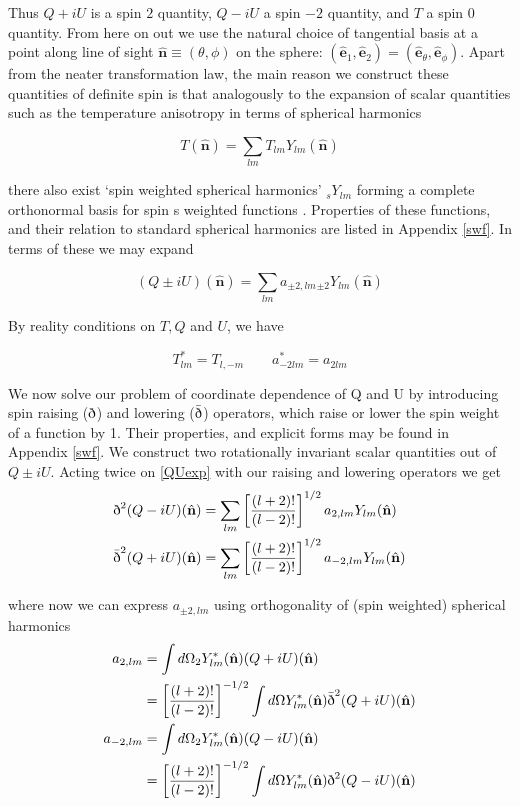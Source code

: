 \documentclass[a4paper,10pt]{article}
\renewcommand{\v}[1]{\mathbf{#1}}
\newcommand{\unit}[1]{\hat{\v{#1}}}
\newcommand{\sr}{\text{\normalfont\dh}}
\renewcommand{\sl}{\bar{\text{\normalfont\dh}}}
\newcommand{\ltwo}{\left[\frac{(l+2)!}{(l-2)!}\right]}
\begin{document}
Thus $Q+iU$ is a spin $2$ quantity, $Q-iU$ a spin $-2$ quantity, and $T$ a spin $0$ quantity. From here on out we use the natural choice of tangential basis at a point along line of sight $\unit{n} \equiv (\theta, \phi)$ on the sphere: $(\unit{e}_1, \unit{e}_2) = (\unit{e}_\theta, \unit{e}_\phi)$. Apart from the neater transformation law, the main reason we construct these quantities of definite spin is that analogously to the expansion of scalar quantities such as the temperature anisotropy in terms of spherical harmonics

\begin{equation}
T(\unit{n}) = \sum_{lm} T_{lm}Y_{lm}(\unit{n})
\end{equation}

there also exist `spin weighted spherical harmonics' $_sY_{lm}$ forming a complete orthonormal basis for spin s weighted functions \cite{all-sky}. Properties of these functions, and their relation to standard spherical harmonics are listed in Appendix \ref{swf}. In terms of these we may expand

\begin{equation}
(Q\pm iU)(\unit{n}) = \sum_{lm} a_{\pm2,lm} {}_{\pm2}Y_{lm}(\unit{n})
\label{QUexp}
\end{equation}

By reality conditions on $T, Q$ and $U$, we have

\begin{equation}
T_{lm}^* = T_{l,-m} \qquad a_{-2lm}^*=a_{2lm}
\end{equation}

We now solve our problem of coordinate dependence of Q and U by introducing spin raising ($\sr$) and lowering  ($\sl$) operators, which raise or lower the spin weight of a function by 1. Their properties, and explicit forms may be found in Appendix \ref{swf}. We construct two rotationally invariant scalar quantities out of $Q\pm iU$. Acting twice on \ref{QUexp} with our raising and lowering operators we get
\begin{equation}\begin{split}
\sr^2(Q-iU)(\unit{n}) &= \sum_{lm} \ltwo^{1/2} a_{2,lm} {}Y_{lm}(\unit{n})\\
\sl^2(Q+iU)(\unit{n}) &= \sum_{lm} \ltwo^{1/2} a_{-2,lm} {}Y_{lm}(\unit{n})
\end{split}\end{equation}

where now we can express $a_{\pm2,lm}$ using orthogonality of (spin weighted) spherical harmonics
\begin{equation}\begin{split}
a_{2,lm} &= \int d\Omega {}_2Y_{lm}^*(\unit{n})(Q+iU)(\unit{n})\\
&= \ltwo^{-1/2}\int d\Omega Y_{lm}^*(\unit{n})\sl^2(Q+iU)(\unit{n})\\
a_{-2,lm} &= \int d\Omega {}_2Y_{lm}^*(\unit{n})(Q-iU)(\unit{n})\\
&= \ltwo^{-1/2}\int d\Omega Y_{lm}^*(\unit{n})\sr^2(Q-iU)(\unit{n})
\end{split}\end{equation}
\end{document}

